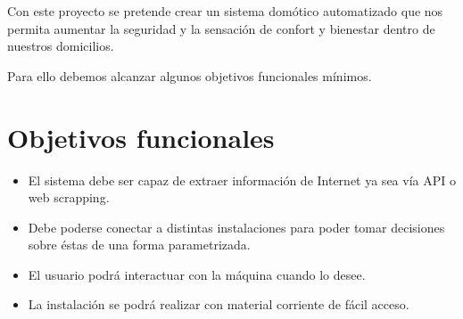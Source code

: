 
Con este proyecto se pretende crear un sistema domótico automatizado que nos permita aumentar la seguridad y la sensación de confort y bienestar dentro de nuestros domicilios.

Para ello debemos alcanzar algunos objetivos funcionales mínimos.

\section{Objetivos funcionales}

\begin{itemize}
    \item El sistema debe ser capaz de extraer información de Internet ya sea vía API o web scrapping.
    \item Debe poderse conectar a distintas instalaciones para poder tomar decisiones sobre éstas de una forma parametrizada.
    \item El usuario podrá interactuar con la máquina cuando lo desee.
    \item La instalación se podrá realizar con material corriente de fácil acceso.
\end{itemize}

